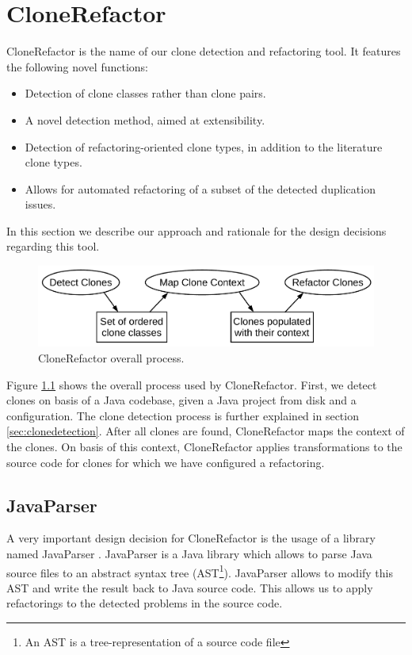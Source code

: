 \chapter{CloneRefactor}
CloneRefactor is the name of our clone detection and refactoring tool. It features the following novel functions:
\begin{itemize}
  \item Detection of clone classes rather than clone pairs.
  \item A novel detection method, aimed at extensibility.
  \item Detection of refactoring-oriented clone types, in addition to the literature clone types.
  \item Allows for automated refactoring of a subset of the detected duplication issues.
\end{itemize}
In this section we describe our approach and rationale for the design decisions regarding this tool.

\begin{figure}[H]
  \centering
  \includegraphics[width=0.8\columnwidth]{img/CloneRefactorOverall}
  \caption{CloneRefactor overall process.}
  \label{fig:clonerefactorprocess}
\end{figure}

Figure \ref{fig:clonerefactorprocess} shows the overall process used by CloneRefactor. First, we detect clones on basis of a Java codebase, given a Java project from disk and a configuration. The clone detection process is further explained in section \ref{sec:clonedetection}. After all clones are found, CloneRefactor maps the context of the clones. On basis of this context, CloneRefactor applies transformations to the source code for clones for which we have configured a refactoring.

\section{JavaParser}
A very important design decision for CloneRefactor is the usage of a library named JavaParser \cite{tomassetti2017javaparser}. JavaParser is a Java library which allows to parse Java source files to an abstract syntax tree (AST\footnote{An AST is a tree-representation of a source code file}). JavaParser allows to modify this AST and write the result back to Java source code. This allows us to apply refactorings to the detected problems in the source code.

